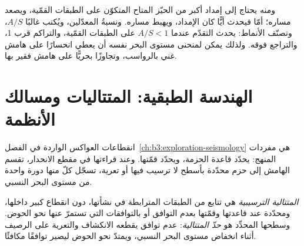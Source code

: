 ومنه يحتاج  إلى إمداد أكبر من الحيّز المتاح
المتكوّن على الطبقات القمّية، ويصعد مساره؛ أمّا  فيحدث
أيًّا كان الإمداد، ويهبط مساره. ونسبةُ المعدّلين،
ويُكتب غالبًا $A/S$، وتصنّف الأنماط: يحدث التقدّم عندما $A/S < 1$ على
الطبقات القمّية، والتراكم قرب 1، والتراجع فوقه.
ولذلك يمكن لمنحنى مستوى البحر نفسه أن يعطي انحسارًا على هامش غني بالرواسب،
وتجاوزًا بحريًّا على هامش فقير بها.

\section{الهندسة الطبقية: المتتاليات ومسالك الأنظمة}\label{sec:b3:sequence-stratigraphy:sequences}

انقطاعات العواكس الواردة في الفصل~\ref{ch:b3:exploration-seismology}
هي مفردات المنهج: يحدّد   قاعدة
الحزمة، ويحدّد   قمّتها. وعند قراءتها في مقطع الانحدار،
تقسم الهامش إلى حزم محدّدة بأسطح لا ترسيب فيها أو
تعرية، تسجّل كلّ منها دورة واحدة من مستوى البحر النسبي.

\begin{definition}\label{def:b3:sequence-stratigraphy:sequence}
\emph{المتتالية الترسيبية} هي تتابع
من الطبقات المترابطة في نشأتها، دون انقطاع كبير داخلها، ومحدّدة عند قاعدتها
وقمّتها بعدم التوافق أو بالتوافقات التي تستمرّ عنها نحو
الحوض. وسطحها المحدِّد هو \emph{حدّ
المتتالية}: عدم توافق يقطعه الانكشاف والتعرية
على الرصيف أثناء انخفاض مستوى البحر النسبي، ويمتدّ نحو الحوض
ليصير توافقًا مكافئًا.
\end{definition}

